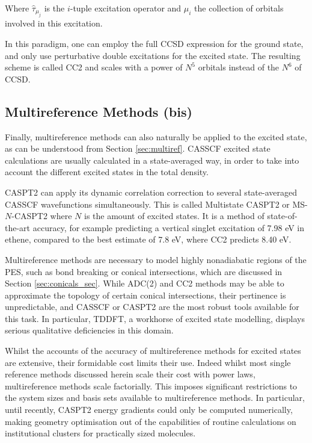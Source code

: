 Where $\hat{\tau}_{\mu_j}$ is the $i$-tuple excitation operator and $\mu_i$ the collection of orbitals involved in this excitation.

In this paradigm, one can employ the full CCSD expression for the ground state, and only use perturbative double excitations for the excited state. The resulting scheme is called CC2 and scales with a power of $N^5$ orbitals instead of the $N^6$ of CCSD.\cite{Christiansen1995}

\subsection{Multireference Methods (bis)}

Finally, multireference methods can also naturally be applied to the excited state, as can be understood from Section \ref{sec:multiref}. CASSCF excited state calculations are usually calculated in a state-averaged way, in order to take into account the different excited states in the total density.

CASPT2 can apply its dynamic correlation correction to several state-averaged CASSCF wavefunctions simultaneously.\cite{Almlof1981} This is called Multistate CASPT2 or MS-$N$-CASPT2 where $N$ is the amount of excited states.\cite{Finley1998} It is a method of state-of-the-art accuracy, for example predicting a vertical singlet excitation of 7.98 eV in ethene, compared to the best estimate of 7.8 eV, where CC2 predicts 8.40 eV.\cite{Schreiber2008}

Multireference methods are necessary to model highly nonadiabatic regions of the PES, such as bond breaking or conical intersections, which are discussed in Section \ref{sec:conicals_sec}. While ADC(2) and CC2 methods may be able to approximate the topology of certain conical intersections,\cite{Tuna2015} their pertinence is unpredictable, and CASSCF or CASPT2 are the most robust tools available for this task. In particular, TDDFT, a workhorse of excited state modelling, displays serious qualitative deficiencies in this domain.\cite{Levine2007}

Whilst the accounts of the accuracy of multireference methods for excited states are extensive,\cite{Silva-Junior2008,Silva-Junior2010,Helmich-Paris2019} their formidable cost limits their use. Indeed whilst most single reference methods discussed herein scale their cost with power laws, multireference methods scale factorially.\cite{Helmich-Paris2019a} This imposes significant restrictions to the system sizes and basis sets available to multireference methods. In particular, until recently, CASPT2 energy gradients could only be computed numerically,\cite{Shiozaki2018} making geometry optimisation out of the capabilities of routine calculations on institutional clusters for practically sized molecules.